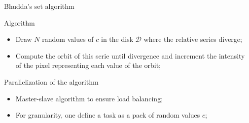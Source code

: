 \documentclass[compress,10pt,aspectratio=169]{beamer}
\begin{document}
\begin{frame}[fragile]{Bhudda's set algorithm}
    \begin{exampleblock}{Algorithm}
        \begin{itemize}
            \item Draw $N$ random values of $c$ in the disk $\mathcal{D}$ where the relative series diverge;
            \item Compute the orbit of this serie until divergence and increment the intensity of the pixel
                  representing each value of the orbit;            
        \end{itemize}
    \end{exampleblock}

    \begin{alertblock}{Parallelization of the algorithm}
        \begin{itemize}
            \item Master-slave algorithm to ensure load balancing;
            \item For granularity, one define a task as a pack of random values $c$;
        \end{itemize}
    \end{alertblock}
\end{frame}
\end{document}
